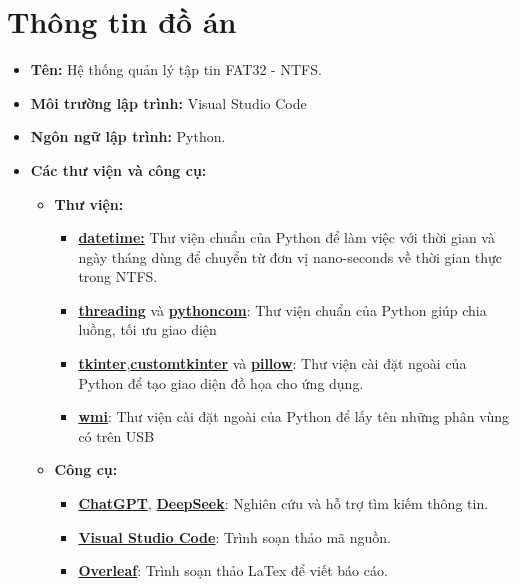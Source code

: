 \section{Thông tin đồ án}
\begin{itemize}
  \item \textbf{Tên:} Hệ thống quản lý tập tin FAT32 - NTFS.
  \item \textbf{Môi trường lập trình:} Visual Studio Code
  \item \textbf{Ngôn ngữ lập trình:} Python.
  \item \textbf{Các thư viện và công cụ:}
        \begin{itemize}
          \item \textbf{Thư viện:}
                \begin{itemize}
                  \item \href{https://docs.python.org/3/library/datetime.html}{\textbf{datetime:}} Thư viện chuẩn của Python để làm việc với thời gian và ngày tháng dùng để chuyển từ đơn vị nano-seconds về thời gian thực trong NTFS.	
                  \item \href{https://docs.python.org/3/library/threading.html}{\textbf{threading}} và \href{https://timgolden.me.uk/pywin32-docs/html/com/win32com/HTML/docindex.html}{\textbf{pythoncom}}: Thư viện chuẩn của Python giúp chia luồng, tối ưu giao diện
				  \item \href{https://docs.python.org/3/library/tkinter.html}{\textbf{tkinter}},\href{https://customtkinter.tomschimansky.com/}{\textbf{customtkinter}} và \href{https://pypi.org/project/pillow/}{\textbf{pillow}}: Thư viện cài đặt ngoài của Python để tạo giao diện đồ họa cho ứng dụng.
				  \item \href{https://timgolden.me.uk/python/wmi/tutorial.html}{\textbf{wmi}}: Thư viện cài đặt ngoài của Python để lấy tên những phân vùng có trên USB
				  
                \end{itemize}
          \item \textbf{Công cụ:}
                \begin{itemize}
                  \item \href{https://chatgpt.com/}{\textbf{ChatGPT}}, \href{https://chat.deepseek.com/}{\textbf{DeepSeek}}: Nghiên cứu và hỗ trợ tìm kiếm thông tin.
                  \item \href{https://code.visualstudio.com/}{\textbf{Visual Studio Code}}: Trình soạn thảo mã nguồn.
                  \item \href{https://www.overleaf.com/}{\textbf{Overleaf}}: Trình soạn thảo LaTex để viết báo cáo.
                  
                \end{itemize}
        \end{itemize}
\end{itemize}
